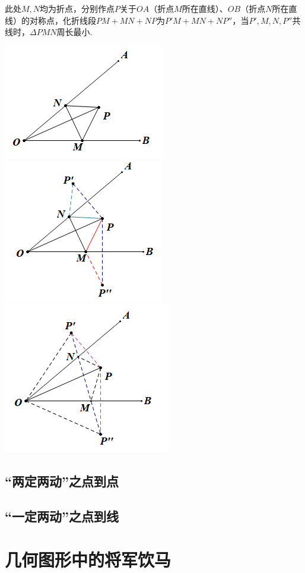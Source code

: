 \documentclass[10pt]{ctexart}
\begin{document}
此处$M,N$均为折点，分别作点$P$关于$OA$（折点$M$所在直线）、$OB$（折点$N$所在直线）的对称点，化折线段$PM+MN+NP$为$P'M+MN+NP''$，当$P',M,N,P''$共线时，$\Delta PMN$周长最小.

\includegraphics[scale=0.6]{figure/2-2.PNG}
\includegraphics[scale=0.6]{figure/2-3.PNG}
\includegraphics[scale=0.6]{figure/2-4.PNG}
\subsection{“两定两动”之点到点}


\subsection{“一定两动”之点到线}
\section{几何图形中的将军饮马}
\end{document}
